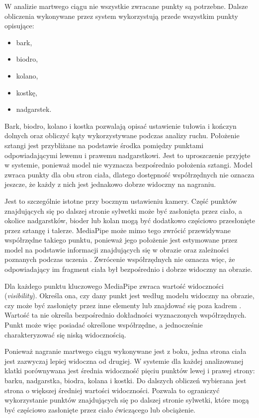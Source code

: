 W analizie martwego ciągu nie wszystkie zwracane punkty są potrzebne. Dalsze obliczenia wykonywane przez system wykorzystują przede wszystkim punkty opisujące:
\begin{itemize}
\item bark,
\item biodro,
\item kolano,
\item kostkę,
\item nadgarstek.
\end{itemize}

Bark, biodro, kolano i kostka pozwalają opisać ustawienie tułowia i kończyn dolnych oraz obliczyć kąty wykorzystywane podczas analizy ruchu. Położenie sztangi jest przybliżane na podstawie środka pomiędzy punktami odpowiadającymi lewemu i prawemu nadgarstkowi. Jest to uproszczenie przyjęte w systemie, ponieważ model nie wyznacza bezpośrednio położenia sztangi. Model zwraca punkty dla obu stron ciała, dlatego dostępność współrzędnych nie oznacza jeszcze, że każdy z nich jest jednakowo dobrze widoczny na nagraniu.

Jest to szczególnie istotne przy bocznym ustawieniu kamery. Część punktów znajdujących się po dalszej stronie sylwetki może być zasłonięta przez ciało, a okolice nadgarstków, bioder lub kolan mogą być dodatkowo częściowo przesłonięte przez sztangę i talerze. MediaPipe może mimo tego zwrócić przewidywane współrzędne takiego punktu, ponieważ jego położenie jest estymowane przez model na podstawie informacji znajdujących się w obrazie oraz zależności poznanych podczas uczenia \cite{bazarevsky2020blazepose}. Zwrócenie współrzędnych nie oznacza więc, że odpowiadający im fragment ciała był bezpośrednio i dobrze widoczny na obrazie.

Dla każdego punktu kluczowego MediaPipe zwraca wartość widoczności (\textit{visibility}). Określa ona, czy dany punkt jest według modelu widoczny na obrazie, czy może być zasłonięty przez inne elementy lub znajdować się poza kadrem \cite{mediapipe_pose_landmarker}. Wartość ta nie określa bezpośrednio dokładności wyznaczonych współrzędnych. Punkt może więc posiadać określone współrzędne, a jednocześnie charakteryzować się niską widocznością.

Ponieważ nagranie martwego ciągu wykonywane jest z boku, jedna strona ciała jest zazwyczaj lepiej widoczna od drugiej. W systemie dla każdej analizowanej klatki porównywana jest średnia widoczność pięciu punktów lewej i prawej strony: barku, nadgarstka, biodra, kolana i kostki. Do dalszych obliczeń wybierana jest strona o większej średniej wartości widoczności. Pozwala to ograniczyć wykorzystanie punktów znajdujących się po dalszej stronie sylwetki, które mogą być częściowo zasłonięte przez ciało ćwiczącego lub obciążenie.

